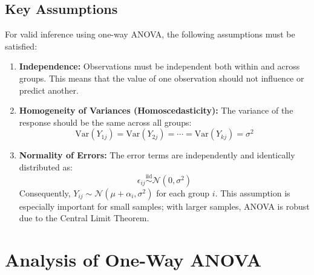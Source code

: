 \documentclass[twoside]{book}
\begin{document}
\subsection{Key Assumptions}

For valid inference using one-way ANOVA, the following assumptions must be satisfied:

\begin{enumerate}
    \item \textbf{Independence:} Observations must be independent both within and across groups. This means that the value of one observation should not influence or predict another.

    \item \textbf{Homogeneity of Variances (Homoscedasticity):} The variance of the response should be the same across all groups:
    \[
    \text{Var}(Y_{1j}) = \text{Var}(Y_{2j}) = \cdots = \text{Var}(Y_{kj}) = \sigma^2
    \]

    \item \textbf{Normality of Errors:} The error terms are independently and identically distributed as:
        \[
        \epsilon_{ij} \overset{\text{iid}}{\sim} \mathcal{N}(0, \sigma^2)
        \]
        Consequently, \( Y_{ij} \sim \mathcal{N}(\mu + \alpha_i, \sigma^2) \) for each group $i$. This assumption is especially important for small samples; with larger samples, ANOVA is robust due to the Central Limit Theorem.
\end{enumerate}


\section{Analysis of One-Way ANOVA}
\end{document}
